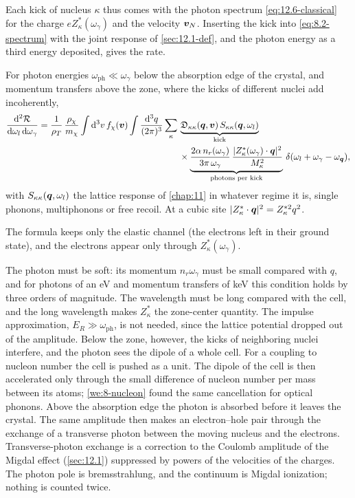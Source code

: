 Each kick of nucleus $\kappa$ thus comes with the photon spectrum \cref{eq:12.6-classical} for the charge $eZ^*_\kappa(\omega_\gamma)$ and the velocity $\bm{v}_N$. Inserting the kick into \cref{eq:8.2-spectrum} with the joint response of \cref{sec:12.1-def}, and the photon energy as a third energy deposited, gives the rate.
\begin{keyresult}
For photon energies $\omega_{\mathrm{ph}} \ll \omega_\gamma$ below the absorption edge of the crystal, and momentum transfers above the zone, where the kicks of different nuclei add incoherently,
\begin{equation}
  \begin{split}
  \frac{\mathrm{d}^2\mathcal{R}}{\mathrm{d}\omega_l\,\mathrm{d}\omega_\gamma} = \frac{1}{\rho_T}\,\frac{\rho_\chi}{m_{\chi}}\int\mathrm{d}^3v\,f_\chi(\bm{v})\int\frac{\mathrm{d}^3q}{(2\pi)^3}\sum_\kappa\,
  &\underbrace{\mathfrak{D}_{\kappa\kappa}(\bm{q},\bm{v})\,S_{\kappa\kappa}(\bm{q},\omega_l)}_{\text{kick}} \\
  &\times\underbrace{\frac{2\alpha\,n_r(\omega_\gamma)}{3\pi\,\omega_\gamma}\,\frac{|Z^*_\kappa(\omega_\gamma)\cdot\bm{q}|^2}{M_\kappa^2}}_{\text{photons per kick}}\,\delta(\omega_l + \omega_\gamma - \omega_{\bm{q}}) ,
  \end{split}
  \label{eq:12.6-brems}
\end{equation}
with $S_{\kappa\kappa}(\bm{q},\omega_l)$ the lattice response of \cref{chap:11} in whatever regime it is, single phonons, multiphonons or free recoil. At a cubic site $|Z^*_\kappa\cdot\bm{q}|^2 = Z^{*2}_\kappa q^2$.
\end{keyresult}
\noindent The formula keeps only the elastic channel (the electrons left in their ground state), and the electrons appear only through $Z^*_\kappa(\omega_\gamma)$.

The photon must be soft: its momentum $n_r\omega_\gamma$ must be small compared with $q$, and for photons of an eV and momentum transfers of keV this condition holds by three orders of magnitude. The wavelength must be long compared with the cell, and the long wavelength makes $Z^*_\kappa$ the zone-center quantity. The impulse approximation, $E_R \gg \omega_{\mathrm{ph}}$, is not needed, since the lattice potential dropped out of the amplitude. Below the zone, however, the kicks of neighboring nuclei interfere, and the photon sees the dipole of a whole cell. For a coupling to nucleon number the cell is pushed as a unit. The dipole of the cell is then accelerated only through the small difference of nucleon number per mass between its atoms; \cref{we:8-nucleon} found the same cancellation for optical phonons. Above the absorption edge the photon is absorbed before it leaves the crystal. The same amplitude then makes an electron--hole pair through the exchange of a transverse photon between the moving nucleus and the electrons. Transverse-photon exchange is a correction to the Coulomb amplitude of the Migdal effect (\cref{sec:12.1}) suppressed by powers of the velocities of the charges. The photon pole is bremsstrahlung, and the continuum is Migdal ionization; nothing is counted twice.

